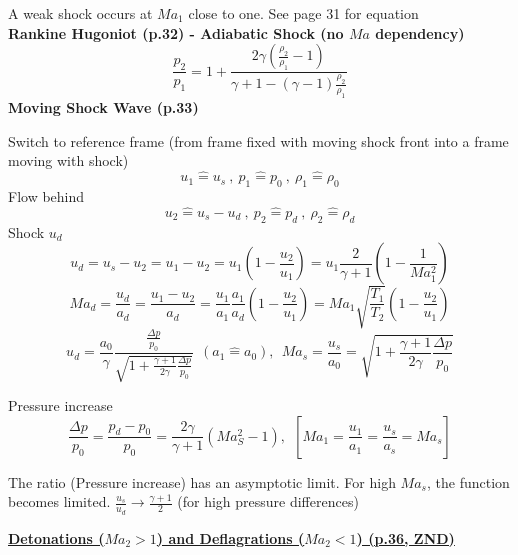 \documentclass[8pt, landscape, fleqn]{scrartcl}
\begin{document}
\begin{multicols*}{3}
A weak shock occurs at $Ma_1$ close to one. See page 31 for equation \\

\textbf{Rankine Hugoniot (p.32) - Adiabatic Shock (no $Ma$ dependency)}
\begin{equation*}
    \frac{p_2}{p_1} = 1 + \frac{2 \gamma \left( \frac{\rho_2}{\rho_1}-1\right)}{\gamma + 1 - (\gamma -1)\frac{\rho_2}{\rho_1}}
\end{equation*} 
\newpage
\textbf{Moving Shock Wave (p.33)}

Switch to reference frame (from frame fixed with moving shock front into a frame moving with shock)
\begin{equation*}
    u_1 \widehat{=} u_s~,~ p_1 \widehat{=} p_0~,~ \rho_1 \widehat{=} \rho_0
\end{equation*}
Flow behind
\begin{equation*}
    u_2 \widehat{=} u_s-u_d~,~ p_2 \widehat{=} p_d~,~ \rho_2 \widehat{=} \rho_d
\end{equation*}
Shock $u_d$
\begin{equation*}
    u_d = u_s - u_2 = u_1 - u_2 = u_1 \left( 1 - \frac{u_2}{u_1}\right) = u_1 \frac{2}{\gamma+1}\left(1- \frac{1}{Ma_1^2}\right)
\end{equation*}
\begin{equation*}
    Ma_d = \frac{u_d}{a_d} = \frac{u_1-u_2}{a_d} = \frac{u_1}{a_1}\frac{a_1}{a_d}\left( 1- \frac{u_2}{u_1}\right) = Ma_1 \sqrt{\frac{T_1}{T_2}}\left(1-\frac{u_2}{u_1}\right)
\end{equation*}
\begin{equation*}
    u_d = \frac{a_0}{\gamma} \frac{\frac{\Delta p}{p_0}}{\sqrt{1 + \frac{\gamma+1}{2\gamma} \frac{\Delta p}{p_0}}}~~(a_1 \hat{=} a_0), ~~ Ma_s = \frac{u_s}{a_0} = \sqrt{1 + \frac{\gamma+1}{2\gamma}\frac{\Delta p}{p_0}}
\end{equation*}

Pressure increase
\begin{equation*}
    \frac{\Delta p}{p_0} = \frac{p_d - p_0}{p_0} = \frac{2 \gamma}{\gamma + 1} \left( Ma_S^2 -1 \right),~~[Ma_1 = \frac{u_1}{a_1} = \frac{u_s}{a_s}=Ma_s]
\end{equation*}

The ratio (Pressure increase) has an asymptotic limit. For high $Ma_s$, the function becomes limited. $\frac{u_s}{u_d} \rightarrow \frac{\gamma+1}{2}$ (for high pressure differences) \newline

\underline{\textbf{Detonations ($Ma_2 >1$) and Deflagrations ($Ma_2 < 1$) (p.36, ZND)}}


\end{multicols*}
\end{document}
